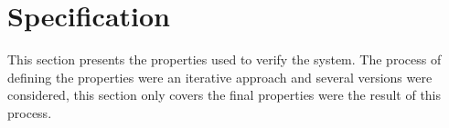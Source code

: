 





\section{Specification}

This section presents the properties used to verify the system. The process of defining the properties were an iterative approach and several versions were considered, this section only covers the final properties were the result of this process. 

